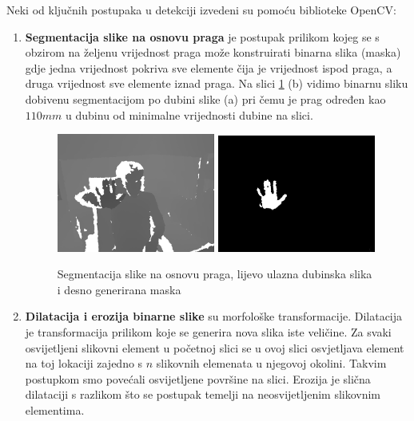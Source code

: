 \documentclass[times, utf8, diplomski, numeric]{fer}
\begin{document}
Neki od ključnih postupaka u detekciji izvedeni su pomoću biblioteke OpenCV:
\begin{enumerate}[label=$\bullet$]
	\item \textbf{Segmentacija slike na osnovu praga} je postupak prilikom kojeg se s obzirom na željenu vrijednost praga može konstruirati binarna slika (maska) gdje jedna vrijednost pokriva sve elemente čija je vrijednost ispod praga, a druga vrijednost sve elemente iznad praga. Na slici \ref{image_segmentation} (b) vidimo binarnu sliku dobivenu segmentacijom po dubini slike (a) pri čemu je prag određen kao $110mm$ u dubinu od minimalne vrijednosti dubine na slici.

\begin{figure}[h!]
\centering
\includegraphics[width = 0.49\textwidth]{detekcija/mask-image}
\includegraphics[width = 0.49\textwidth]{detekcija/mask-mask}
\caption{Segmentacija slike na osnovu praga, lijevo ulazna dubinska slika i desno generirana maska} \label{image_segmentation}
\end{figure}	

\item \textbf{Dilatacija i erozija binarne slike} su morfološke transformacije. Dilatacija je transformacija prilikom koje se generira nova slika iste veličine. Za svaki osvijetljeni slikovni element u početnoj slici se u ovoj slici osvjetljava element na toj lokaciji zajedno s $n$ slikovnih elemenata u njegovoj okolini. Takvim postupkom smo povećali osvijetljene površine na slici. Erozija je slična dilataciji s razlikom što se postupak temelji na neosvijetljenim slikovnim elementima.


\end{enumerate}
\end{document}
